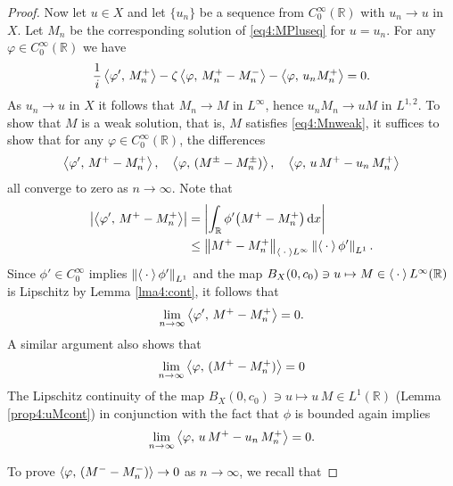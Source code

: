 \documentclass[../dissertation.tex]{subfiles}
\begin{document}
\begin{proof}
	Now let $u \in X$ and let $\{ u_n \}$ be a sequence from $C_0^\infty(\mathbb R)$ 
	with $u_n \to u$ in $X$. Let $M_n$ be the corresponding solution of 
	\eqref{eq4:MPluseq} for $u=u_n$. For any $\varphi \in C_0^\infty(\mathbb R)$ we have
	\begin{align}\label{eq4:Mnweak}
		\frac{1}{i} \left\langle \varphi', \, M^+_n \right\rangle - \zeta \left\langle \varphi,\,M_n^+ - M_n^- \right\rangle  
			- \left\langle \varphi, \, u_n M^+_n \right\rangle = 0.
	\end{align}
	As $u_n \to u$ in $X$ it follows that $M_n \to M$ in $L^\infty$, hence 
	$u_n M_n \to uM$ in $L^{1,2}$. To show that $M$ is a weak solution, 
	that is, $M$ satisfies \eqref{eq4:Mnweak}, it
	suf{}fices to show that for any $\varphi \in C_0^\infty(\mathbb R)$,  the 
	dif{}ferences
	\[
		\left\langle \varphi', \, M^+-M^+_n \right\rangle, \quad
		\left\langle \varphi, \, (M^\pm - M_n^\pm) \right\rangle, \quad
		\left\langle \varphi, \, u\,M^+ - u_n\,M_n^+ \right\rangle
	\]
	all converge to zero as $n \to \infty$. 
	Note that 
	\begin{align*}
		\left|\left\langle \varphi', \, M^+-M^+_n \right\rangle\right|
			&= \left|\int_{\mathbb R} \phi'\big(M^+ - M_n^+\big) \, \mathrm{d}x \right| \\
			&\leq \left\| M^+ - M_n^+ \right\|_{\left\langle \kern 0.5ex \cdot \kern 0.5ex \right\rangle L^\infty} \left\| \left\langle \kern 0.5ex \cdot \kern 0.5ex \right\rangle\phi' \right\|_{L^1}.
	\end{align*}
	Since $\phi' \in C_0^\infty$ implies $\left\| \left\langle \kern 0.5ex \cdot \kern 0.5ex \right\rangle\phi' \right\|_{L^1}$ and the map 
	$B_X(0, c_0) \ni u \mapsto M\in\left\langle \kern 0.5ex \cdot \kern 0.5ex \right\rangle L^\infty(\mathbb R)$ is Lipschitz
	by Lemma \ref{lma4:cont}, it follows that
	\[
		\lim_{n\to\infty} \left\langle \varphi', \, M^+-M^+_n \right\rangle = 0.
	\]
	A similar argument also shows that 
	\[
		\lim_{n\to\infty} \left\langle \varphi, \, (M^+ - M_n^+) \right\rangle= 0
	\]
	The Lipschitz continuity of the map 
	$B_X(0, c_0) \ni u \mapsto u\,M \in L^1(\mathbb R)$ (Lemma \ref{prop4:uMcont}) 
	in conjunction with the fact that $\phi$ is bounded again implies
	\[
		\lim_{n\to\infty} \left\langle \varphi, \, u\,M^+ - u_n\,M_n^+ \right\rangle = 0.
	\]

	To prove $\left\langle \varphi, \, (M^- - M_n^-) \right\rangle \to 0$ as $n \to \infty$, we 
	recall that


\end{proof}
\end{document}

